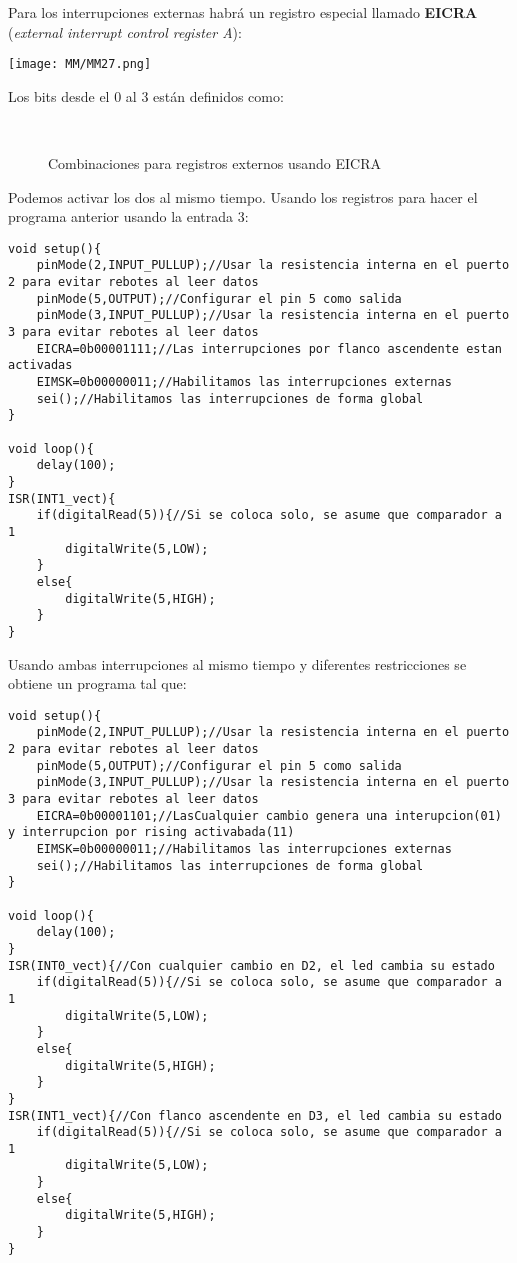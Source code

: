 \documentclass[
	12pt, %
	fleqn, %
	a4paper, %
	oneside, %
]{LegrandOrangeBook}
\begin{document}
Para los interrupciones externas habrá un registro especial llamado \textbf{EICRA} (\textit{external interrupt control register A}):
\begin{center}
\texttt{[image: MM/MM27.png]}
\end{center}
Los bits desde el 0 al 3 están definidos como:
\begin{figure}[H]
\centering
{}\\
\caption{Combinaciones para registros externos usando EICRA}
\end{figure}
Podemos activar los dos al mismo tiempo. Usando los registros para hacer el programa anterior usando la entrada 3:
\begin{lstlisting}[language=Arduino,caption={Interrupción flanco ascendente usando registros específicos}]
void setup(){
	pinMode(2,INPUT_PULLUP);//Usar la resistencia interna en el puerto 2 para evitar rebotes al leer datos
	pinMode(5,OUTPUT);//Configurar el pin 5 como salida
	pinMode(3,INPUT_PULLUP);//Usar la resistencia interna en el puerto 3 para evitar rebotes al leer datos
	EICRA=0b00001111;//Las interrupciones por flanco ascendente estan activadas
	EIMSK=0b00000011;//Habilitamos las interrupciones externas
	sei();//Habilitamos las interrupciones de forma global
}	

void loop(){
	delay(100);
}
ISR(INT1_vect){
	if(digitalRead(5)){//Si se coloca solo, se asume que comparador a 1
		digitalWrite(5,LOW);
	}
	else{
		digitalWrite(5,HIGH);
	}
}
\end{lstlisting}
Usando ambas interrupciones al mismo tiempo y diferentes restricciones se obtiene un programa tal que:
\begin{lstlisting}[language=Arduino,caption={D2 se interrumpe a cualquier flanco y D3 con flanco ascendente}]
void setup(){
	pinMode(2,INPUT_PULLUP);//Usar la resistencia interna en el puerto 2 para evitar rebotes al leer datos
	pinMode(5,OUTPUT);//Configurar el pin 5 como salida
	pinMode(3,INPUT_PULLUP);//Usar la resistencia interna en el puerto 3 para evitar rebotes al leer datos
	EICRA=0b00001101;//LasCualquier cambio genera una interupcion(01) y interrupcion por rising activabada(11)
	EIMSK=0b00000011;//Habilitamos las interrupciones externas
	sei();//Habilitamos las interrupciones de forma global
}	

void loop(){
	delay(100);
}
ISR(INT0_vect){//Con cualquier cambio en D2, el led cambia su estado
	if(digitalRead(5)){//Si se coloca solo, se asume que comparador a 1
		digitalWrite(5,LOW);
	}
	else{
		digitalWrite(5,HIGH);
	}
}
ISR(INT1_vect){//Con flanco ascendente en D3, el led cambia su estado
	if(digitalRead(5)){//Si se coloca solo, se asume que comparador a 1
		digitalWrite(5,LOW);
	}
	else{
		digitalWrite(5,HIGH);
	}
}
\end{lstlisting}
\end{document}
